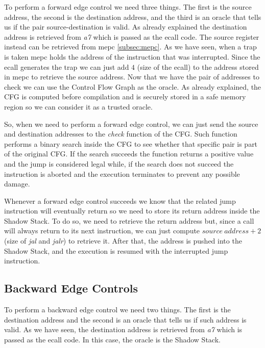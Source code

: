 To perform a forward edge control we need three things. The first is the source
address, the second is the destination address, and the third is an oracle that
tells us if the pair source-destination is valid. As already explained the destination
address is retrieved from \textit{a7} which is passed as the ecall code. The source
register instead can be retrieved from mepc \ref{subsec:mepc}. As we have seen, when
a trap is taken mepc holds the address of the instruction that was interrupted.
Since the ecall generates the trap we can just add $4$ (size of the ecall) to
the address stored in mepc to retrieve the source address. Now that we have the pair
of addresses to check we can use the Control Flow Graph as the oracle. As
already explained, the CFG is computed before compilation and is securely stored
in a safe memory region so we can consider it as a trusted oracle.

So, when we need to perform a forward edge control, we can just send the source and
destination addresses to the \textit{check} function of the CFG. Such function performs
a binary search inside the CFG to see whether that specific pair is part of the original
CFG. If the search succeeds the function returns a positive value and the jump
is considered legal while, if the search does not succeed the instruction is aborted
and the execution terminates to prevent any possible damage.

Whenever a forward edge control succeeds we know that the related jump instruction
will eventually return so we need to store its return address inside the Shadow Stack.
To do so, we need to retrieve the return address but, since a call will always
return to its next instruction, we can just compute $source \ address + 2$ (size
of \textit{jal} and \textit{jalr}) to retrieve it. After that, the address is pushed
into the Shadow Stack, and the execution is resumed with the interrupted jump
instruction.

\subsection{Backward Edge Controls}
\label{subsec:backward}

To perform a backward edge control we need two things. The first is the
destination address and the second is an oracle that tells us if such address is
valid. As we have seen, the destination address is retrieved from \textit{a7} which
is passed as the ecall code. In this case, the oracle is the Shadow Stack.

